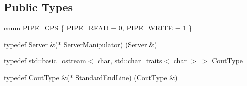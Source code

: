 \subsection*{Public Types}
\begin{DoxyCompactItemize}
\item 
enum \hyperlink{class_minecraft_server_service_1_1_server_a7b9b73779645007e9f9c33dac1436d47}{P\+I\+P\+E\+\_\+\+O\+PS} \{ \hyperlink{class_minecraft_server_service_1_1_server_a7b9b73779645007e9f9c33dac1436d47ae4f50d706aa789aa79b1815ea83ca96a}{P\+I\+P\+E\+\_\+\+R\+E\+AD} = 0, 
\hyperlink{class_minecraft_server_service_1_1_server_a7b9b73779645007e9f9c33dac1436d47a57f3281db4e9bfe3825337d696eb24a4}{P\+I\+P\+E\+\_\+\+W\+R\+I\+TE} = 1
 \}
\item 
typedef \hyperlink{class_minecraft_server_service_1_1_server}{Server} \&($\ast$ \hyperlink{class_minecraft_server_service_1_1_server_af07a3457e3239d898b8f84809b0703e4}{Server\+Manipulator}) (\hyperlink{class_minecraft_server_service_1_1_server}{Server} \&)
\item 
typedef std\+::basic\+\_\+ostream$<$ char, std\+::char\+\_\+traits$<$ char $>$ $>$ \hyperlink{class_minecraft_server_service_1_1_server_a9a78d018fb71e9aa0a054ff39cba5083}{Cout\+Type}
\item 
typedef \hyperlink{class_minecraft_server_service_1_1_server_a9a78d018fb71e9aa0a054ff39cba5083}{Cout\+Type} \&($\ast$ \hyperlink{class_minecraft_server_service_1_1_server_aabd71f679656f27eec9b0d66be40f5a1}{Standard\+End\+Line}) (\hyperlink{class_minecraft_server_service_1_1_server_a9a78d018fb71e9aa0a054ff39cba5083}{Cout\+Type} \&)
\end{DoxyCompactItemize}
